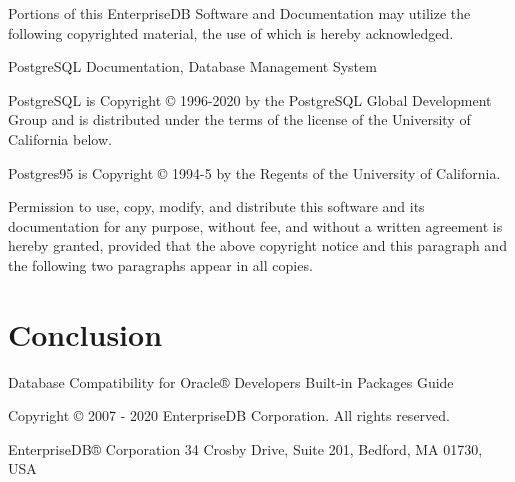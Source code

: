 \documentclass[letterpaper,10pt,english,openany,oneside]{sphinxmanual}
\begin{document}
Portions of this EnterpriseDB Software and Documentation may utilize the
following copyrighted material, the use of which is hereby acknowledged.

PostgreSQL Documentation, Database Management System

PostgreSQL is Copyright © 1996-2020 by the PostgreSQL Global Development
Group and is distributed under the terms of the license of the
University of California below.

Postgres95 is Copyright © 1994-5 by the Regents of the University of
California.

Permission to use, copy, modify, and distribute this software and its
documentation for any purpose, without fee, and without a written
agreement is hereby granted, provided that the above copyright notice
and this paragraph and the following two paragraphs appear in all
copies.




\chapter{Conclusion}
\label{\detokenize{conclusion::doc}}\label{\detokenize{conclusion:id1}}\label{\detokenize{conclusion:conclusion}}
Database Compatibility for Oracle® Developers Built-in Packages Guide

Copyright © 2007 - 2020 EnterpriseDB Corporation. All rights reserved.

EnterpriseDB® Corporation
34 Crosby Drive, Suite 201, Bedford, MA 01730, USA
\end{document}
